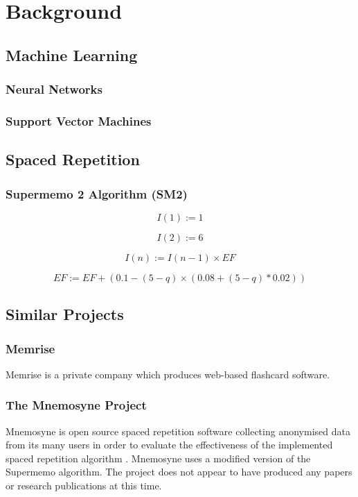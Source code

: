 \section{Background}
\label{background}

\subsection{Machine Learning} \label{background_machinelearning}
\subsubsection{Neural Networks}
\subsubsection{Support Vector Machines}
\subsection{Spaced Repetition} \label{background_spacedrepetition}
\subsubsection*{Supermemo 2 Algorithm (SM2)}
\begin{equation}
I(1) := 1
\end{equation}

\begin{equation}
I(2) := 6
\end{equation}

\begin{equation}
I(n) := I(n-1) \times EF
\end{equation}

\begin{equation}
EF := EF + (0.1 - (5 - q) \times (0.08 + (5 - q) * 0.02))
\end{equation}

\subsection{Similar Projects} \label{background_similarprojects}
\subsubsection*{Memrise}
Memrise is a private company which produces web-based flashcard software.

\subsubsection*{The Mnemosyne Project}
Mnemosyne is open source spaced repetition software collecting anonymised data from its many users in order
to evaluate the effectiveness of the implemented spaced repetition algorithm \cite{peter_bienstman_principles_2012}.
Mnemosyne uses a modified version of the Supermemo algorithm.
The project does not appear to have produced any papers or research publications at this time.

